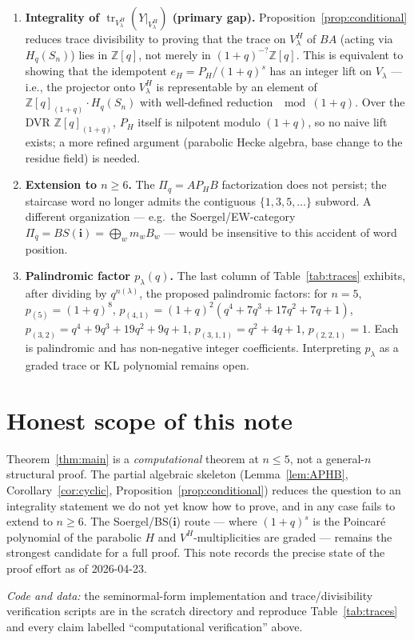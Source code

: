 \documentclass[11pt]{article}
\theoremstyle{definition}
\newcommand{\Pq}{\Pi_q}
\newcommand{\PH}{P_H}
\newcommand{\Hq}{H_q(S_n)}
\newcommand{\Z}{\mathbb{Z}}
\newcommand{\tr}{\operatorname{tr}}
\begin{document}
\begin{enumerate}
\item \textbf{Integrality of $\tr_{V_\lambda^H}(Y|_{V_\lambda^H})$
  (primary gap).} Proposition~\ref{prop:conditional} reduces trace
  divisibility to proving that the trace on $V_\lambda^H$ of $BA$
  (acting via $\Hq$) lies in $\Z[q]$, not merely in
  $(1+q)^{-?}\Z[q]$. This is equivalent to showing that the idempotent
  $e_H=\PH/(1+q)^s$ has an integer lift on $V_\lambda$ --- i.e., the
  projector onto $V_\lambda^H$ is representable by an element of
  $\Z[q]_{(1+q)}\cdot\Hq$ with well-defined reduction $\mod(1+q)$. Over
  the DVR $\Z[q]_{(1+q)}$, $\PH$ itself is nilpotent modulo $(1+q)$, so
  no naive lift exists; a more refined argument (parabolic Hecke
  algebra, base change to the residue field) is needed.
\item \textbf{Extension to $n\ge 6$.} The
  $\Pq=A\PH B$ factorization does not persist; the staircase word no
  longer admits the contiguous $\{1,3,5,\ldots\}$ subword. A different
  organization --- e.g.\ the Soergel/EW-category
  $\Pq=BS(\mathbf{i})=\bigoplus_w m_w B_w$ --- would be insensitive to
  this accident of word position.
\item \textbf{Palindromic factor $p_\lambda(q)$.} The last column of
  Table~\ref{tab:traces} exhibits, after dividing by $q^{n(\lambda)}$,
  the proposed palindromic factors: for $n=5$,
  $p_{(5)}=(1+q)^8$, $p_{(4,1)}=(1+q)^2(q^4+7q^3+17q^2+7q+1)$,
  $p_{(3,2)}=q^4+9q^3+19q^2+9q+1$, $p_{(3,1,1)}=q^2+4q+1$,
  $p_{(2,2,1)}=1$. Each is palindromic and has non-negative integer
  coefficients. Interpreting $p_\lambda$ as a graded trace or KL
  polynomial remains open.
\end{enumerate}

\section*{Honest scope of this note}

Theorem~\ref{thm:main} is a \emph{computational} theorem at $n\le 5$, not
a general-$n$ structural proof. The partial algebraic skeleton
(Lemma~\ref{lem:APHB}, Corollary~\ref{cor:cyclic},
Proposition~\ref{prop:conditional}) reduces the question to an
integrality statement we do not yet know how to prove, and in any case
fails to extend to $n\ge 6$. The Soergel/BS($\mathbf{i}$) route --- where
$(1+q)^s$ is the Poincar\'e polynomial of the parabolic $H$ and
$V^H$-multiplicities are graded --- remains the strongest candidate for
a full proof. This note records the precise state of the proof effort as
of 2026-04-23.

\bigskip

\noindent\emph{Code and data:} the seminormal-form implementation and
trace/divisibility verification scripts are in the scratch directory and
reproduce Table~\ref{tab:traces} and every claim labelled
``computational verification'' above.
\end{document}

